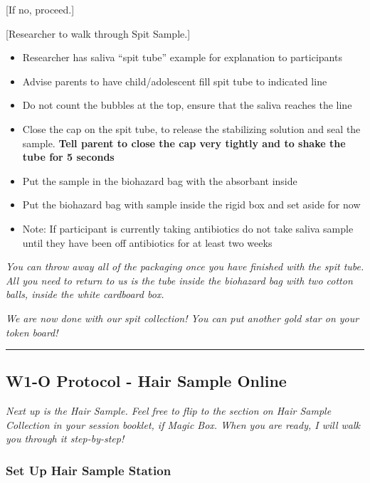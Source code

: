 \documentclass[]{book}
\providecommand{\tightlist}{%
  \setlength{\itemsep}{0pt}\setlength{\parskip}{0pt}}
\begin{document}
{[}If no, proceed.{]}

{[}Researcher to walk through Spit Sample.{]}

\begin{itemize}
\tightlist
\item
  Researcher has saliva ``spit tube'' example for explanation to participants
\item
  Advise parents to have child/adolescent fill spit tube to indicated line
\item
  Do not count the bubbles at the top, ensure that the saliva reaches the line
\item
  Close the cap on the spit tube, to release the stabilizing solution and seal the sample.
  \textbf{Tell parent to close the cap very tightly and to shake the tube for 5 seconds}
\item
  Put the sample in the biohazard bag with the absorbant inside
\item
  Put the biohazard bag with sample inside the rigid box and set aside for now
\item
  Note: If participant is currently taking antibiotics do not take saliva sample until they have been off antibiotics for at least two weeks
\end{itemize}

\emph{You can throw away all of the packaging once you have finished with the spit tube. All you need to return to us is the tube inside the biohazard bag with two cotton balls, inside the white cardboard box.}

\emph{We are now done with our spit collection! You can put another gold star on your token board!}

\begin{center}\rule{0.5\linewidth}{0.5pt}\end{center}

\hypertarget{w1-o-protocol---hair-sample-online}{%
\subsection{W1-O Protocol - Hair Sample Online}\label{w1-o-protocol---hair-sample-online}}

\emph{Next up is the Hair Sample. Feel free to flip to the section on Hair Sample Collection in your session booklet, if Magic Box. When you are ready, I will walk you through it step-by-step!}

\hypertarget{set-up-hair-sample-station-1}{%
\subsubsection{Set Up Hair Sample Station}\label{set-up-hair-sample-station-1}}
\end{document}
